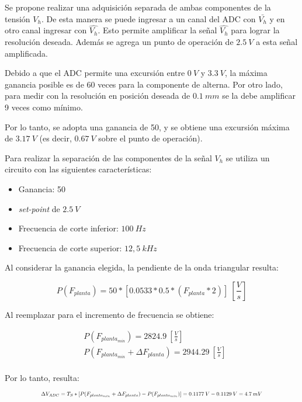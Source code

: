 Se propone realizar una adquisición separada de ambas componentes de la tensión $V_h$. De esta manera se puede ingresar a un canal del ADC con $\bar{V_h}$ y en otro canal ingresar con $\hat{V_h}$. Esto permite amplificar la señal $\hat{V_h}$ para lograr la resolución deseada. Además se agrega un punto de operación de $2.5\:V$ a esta señal amplificada.

Debido a que el ADC permite una excursión entre $0\:V$ y $3.3\:V$, la máxima ganancia posible es de 60 veces para la componente de alterna. Por otro lado, para medir con la resolución en posición deseada de $0.1\:mm$ se la debe amplificar 9 veces como mínimo.

Por lo tanto, se adopta una ganancia de 50, y se obtiene una excursión máxima de $3.17\:V$ (es decir, $0.67\:V$ sobre el punto de operación).

Para realizar la separación de las componentes de la señal $V_h$ se utiliza un circuito con las siguientes características:

\begin{itemize}
	\item Ganancia: 50
	\item \textsl{set-point} de $2.5\:V$
	\item Frecuencia de corte inferior: $100\:Hz$
	\item Frecuencia de corte superior: $12,5\:kHz$
\end{itemize}

 Al considerar la ganancia elegida,  la pendiente de la onda triangular resulta:

\begin{equation} 
	P(F_{planta}) = 50 * [0.0533 * 0.5 * (F_{planta}*2)]\:[\frac{V}{s}]
\end{equation}

 Al reemplazar para el incremento de frecuencia se obtiene: 

\begin{equation} 
	\begin{aligned}
		&P(F_{planta_{min}}) = 2824.9 \: [\frac{V}{s}]\\
		&P(F_{planta_{min}} + \Delta F_{planta}) = 2944.29 \: [\frac{V}{s}]\\		 
	\end{aligned}
\end{equation}

 Por lo tanto, resulta:


\begin{equation} 
	\resizebox{.8\hsize}{!}
	{
	$\Delta V_{ADC} = T_S * [P(F_{planta_{min}} + \Delta F_{planta}) - P(F_{planta_{min}})] = 0.1177\:V - 0.1129\:V = 4.7\:mV$
	}
\end{equation}



